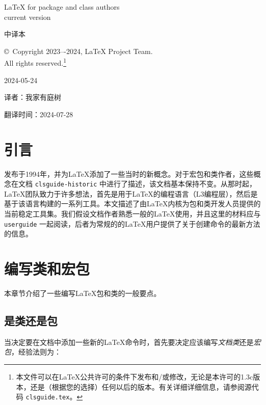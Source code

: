 \documentclass[12pt]{ltxguide}
\begin{document}
\begin{titlepage}
\centering
{\huge \LaTeX{} for package and class authors \\ current version}

\vspace{0.025\textheight}

{\huge 中译本}

\vspace{0.025\textheight}

{\huge \copyright~Copyright 2023–-2024, \LaTeX{} Project Team. \\ All rights reserved.\footnote{本文件可以在\LaTeX{}公共许可的条件下发布和/或修改，无论是本许可的1.3c版本，还是（根据您的选择）任何以后的版本。有关详细详细信息，请参阅源代码 \texttt{clsguide.tex}。}}

\vspace{0.025\textheight}

{\huge 2024-05-24}

\vspace{0.025\textheight}

{\huge 译者：我家有庭树}

\vspace{0.025\textheight}

{\huge 翻译时间：2024-07-28}

\end{titlepage}

\tableofcontents

\section{引言}
\LaTeXe{}发布于1994年，并为\LaTeX{}添加了一些当时的新概念。对于宏包和类作者，这些概念在文档 \texttt{clsguide-historic} 中进行了描述，该文档基本保持不变。从那时起，\LaTeX{}团队致力于许多想法，首先是用于\LaTeX{}的编程语言（L3编程层），然后是基于该语言构建的一系列工具。本文描述了由\LaTeX{}内核为包和类开发人员提供的当前稳定工具集。我们假设文档作者熟悉一般的\LaTeX{}使用，并且这里的材料应与 \texttt{userguide} 一起阅读，后者为常规的的\LaTeX{}用户提供了关于创建命令的最新方法的信息。

\section{编写类和宏包}
本章节介绍了一些编写\LaTeX{}包和类的一般要点。

\subsection{是类还是包}
当决定要在文档中添加一些新的\LaTeX{}命令时，首先要决定应该编写\emph{文档类}还是\emph{宏包}，经验法则为：
\end{document}
